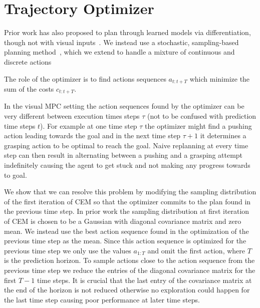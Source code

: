 \section{Trajectory Optimizer}
\label{sec:optimizer}
Prior work has also proposed to plan through learned models via differentiation, though not with visual inputs~\cite{deep_mpc}. We instead use a stochastic, sampling-based planning method~\cite{cem-rk-13,foresight}, which we extend to handle a mixture of continuous and discrete actions

The role of the optimizer is to find actions sequences $a_{t:t+T}$ which minimize the sum of the costs $c_{t:t+T}$.

In the visual MPC setting the action sequences found by the optimizer can be very different between execution times steps $\tau$ (not to be confused with prediction time steps $t$). For example at one time step $\tau$ the optimizer might find a pushing action leading towards the goal and in the next time step $\tau+1$ it determines a grasping action to be optimal to reach the goal. Naive replanning at every time step can then result in alternating between a pushing and a grasping attempt indefinitely causing the agent to get stuck and not making any progress towards to goal. 

We show that we can resolve this problem by modifying the sampling distribution of the first iteration of CEM so that the optimizer commits to the plan found in the previous time step. In prior work \cite{sna} the sampling distribution at first iteration of CEM is chosen to be a Gaussian with diagonal covariance matrix and zero mean. We instead use the best action sequence found in the optimization of the previous time step as the mean. Since this action sequence is optimized for the previous time step we only use the values $a_{1:T}$ and omit the first action, where $T$ is the prediction horizon. To sample actions close to the action sequence from the previous time step we reduce the entries of the diagonal covariance matrix for the first $T-1$ time steps. It is crucial that the last entry of the covariance matrix at the end of the horizon is not reduced otherwise no exploration could happen for the last time step causing poor performance at later time steps.